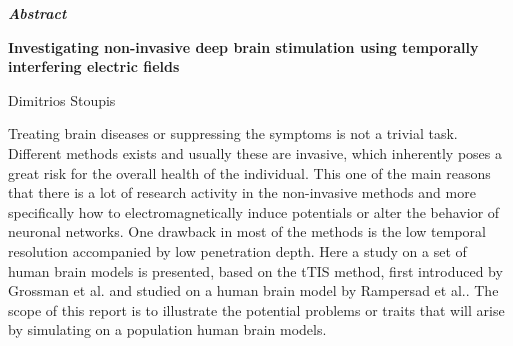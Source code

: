 \thispagestyle{plain}
\vspace*{\fill}
\begin{center}
    \LARGE
    \textit{\textbf{Abstract}}
        
    \vspace{0.4cm}
    \large
    \textbf{Investigating non-invasive deep brain stimulation using temporally interfering electric fields}
        
    \vspace{0.4cm}
    Dimitrios Stoupis
\end{center}
\normalsize

\vspace{0.9cm}
Treating brain diseases or suppressing the symptoms is not a trivial task. Different methods exists and usually these are invasive, which inherently poses a great risk for the overall health of the individual. This one of the main reasons that there is a lot of research activity in the non-invasive methods and more specifically how to electromagnetically induce potentials or alter the behavior of neuronal networks. One drawback in most of the methods is the low temporal resolution accompanied by low penetration depth. Here a study on a set of human brain models\cite{ErikG.Lee2016} is presented, based on the \gls{tTIS} method, first introduced by Grossman et al.\cite{Grossman2017} and studied on a human brain model by Rampersad et al.\cite{Rampersad2019}. The scope of this report is to illustrate the potential problems or traits that will arise by simulating on a population human brain models. 
\vspace*{\fill}
